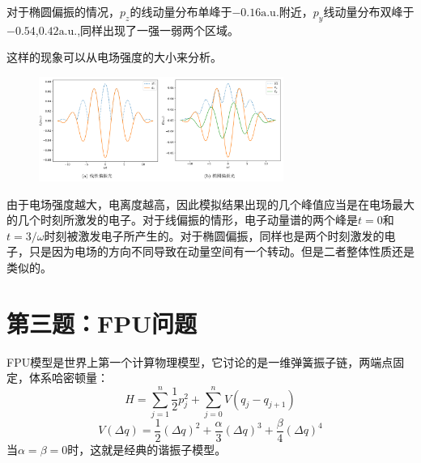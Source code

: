 \documentclass[a4paper]{ctexart}
\begin{document}
对于椭圆偏振的情况，$p_z$的线动量分布单峰于$-0.16\text{a.u.}$附近，$p_y$线动量分布双峰于$-0.54$,$0.42\text{a.u.}$,同样出现了一强一弱两个区域。

这样的现象可以从电场强度的大小来分析。
\begin{figure}[hbt]
	\centering
	\includegraphics[width=8cm]{./fig/Prob2_2.png}
\end{figure}
由于电场强度越大，电离度越高，因此模拟结果出现的几个峰值应当是在电场最大的几个时刻所激发的电子。对于线偏振的情形，电子动量谱的两个峰是$t=0$和$t=3/\omega$时刻被激发电子所产生的。对于椭圆偏振，同样也是两个时刻激发的电子，只是因为电场的方向不同导致在动量空间有一个转动。但是二者整体性质还是类似的。
\section{第三题：FPU问题}
FPU模型是世界上第一个计算物理模型，它讨论的是一维弹簧振子链，两端点固定，体系哈密顿量：
\begin{equation}
H=\sum_{j=1}^{n} \frac{1}{2} p_{j}^{2}+\sum_{j=0}^{n} V\left(q_{j}-q_{j+1}\right)
\end{equation}
\begin{equation}
V(\Delta q)=\frac{1}{2}(\Delta q)^{2}+\frac{\alpha}{3}(\Delta q)^{3}+\frac{\beta}{4}(\Delta q)^{4}
\end{equation}
当$\alpha = \beta = 0$时，这就是经典的谐振子模型。
\end{document}
